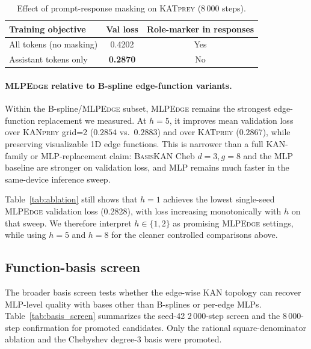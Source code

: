 \documentclass{article}
\newcommand{\mlpedge}{\textsc{MLPEdge}}
\newcommand{\kanprey}{\textsc{KANprey}}
\newcommand{\katprey}{\textsc{KATprey}}
\newcommand{\basiskan}{\textsc{BasisKAN}}
\begin{document}
\begin{table}[h]
\centering
\caption{Effect of prompt-response masking on \katprey{} (8\,000 steps).}
\label{tab:masking}
\begin{tabular}{lcc}
\toprule
Training objective & Val loss & Role-marker in responses \\
\midrule
All tokens (no masking) & 0.4202 & Yes \\
Assistant tokens only  & \textbf{0.2870} & No \\
\bottomrule
\end{tabular}
\end{table}

\paragraph{\mlpedge{} relative to B-spline edge-function variants.}
Within the B-spline/\mlpedge{} subset, \mlpedge{} remains the strongest
edge-function replacement we measured.
At $h=5$, it improves mean validation loss over \kanprey{} grid=2
($0.2854$ vs.\ $0.2883$) and over \katprey{} ($0.2867$), while preserving
visualizable 1D edge functions.
This is narrower than a full KAN-family or MLP-replacement claim:
\basiskan{} Cheb $d=3,g=8$ and the MLP baseline are stronger on validation loss,
and MLP remains much faster in the same-device inference sweep.

Table~\ref{tab:ablation} still shows that $h=1$ achieves the lowest
single-seed \mlpedge{} validation loss (0.2828), with loss increasing
monotonically with $h$ on that sweep.
We therefore interpret $h \in \{1,2\}$ as promising \mlpedge{} settings, while
using $h=5$ and $h=8$ for the cleaner controlled comparisons above.

\subsection{Function-basis screen}
\label{sec:basis_screen}

The broader basis screen tests whether the edge-wise KAN topology can recover
MLP-level quality with bases other than B-splines or per-edge MLPs.
Table~\ref{tab:basis_screen} summarizes the seed-42 2\,000-step screen and the
8\,000-step confirmation for promoted candidates.
Only the rational square-denominator ablation and the Chebyshev degree-3 basis
were promoted.
\end{document}

